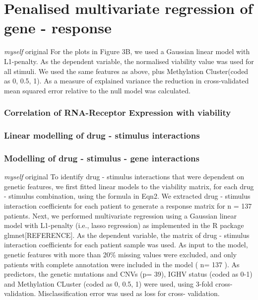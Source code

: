 \documentclass[11pt, a4paper, twosided]{book}
\begin{document}
\hypertarget{penalised-multivariate-regression-of-gene---response}{%
\chapter{Penalised multivariate regression of gene - response}\label{penalised-multivariate-regression-of-gene---response}}

\emph{myself} original
For the plots in Figure 3B, we used a Gaussian linear model with L1-penalty. As the dependent variable, the normalised viability value was used for all stimuli. We used the same features as above, plus Methylation Cluster(coded as 0, 0.5, 1). As a measure of explained variance the reduction in cross-validated mean squared error relative to the null model was calculated.

\hypertarget{correlation-of-rna-receptor-expression-with-viability}{%
\subsection{Correlation of RNA-Receptor Expression with viability}\label{correlation-of-rna-receptor-expression-with-viability}}

\hypertarget{linear-modelling-of-drug---stimulus-interactions}{%
\subsection{Linear modelling of drug - stimulus interactions}\label{linear-modelling-of-drug---stimulus-interactions}}

\hypertarget{modelling-of-drug---stimulus---gene-interactions}{%
\subsection{Modelling of drug - stimulus - gene interactions}\label{modelling-of-drug---stimulus---gene-interactions}}

\emph{myself} original
To identify drug - stimulus interactions that were dependent on genetic features, we first fitted linear models to the viability matrix, for each drug - stimulus combination, using the formula in Eqn2. We extracted drug - stimulus interaction coefficients for each patient to generate a response matrix for n = 137 patients. Next, we performed multivariate regression using a Gaussian linear model with L1-penalty (i.e., lasso regression) as implemented in the R package glmnet{[}REFERENCE{]}. As the dependent variable, the matrix of drug - stimulus interaction coefficients for each patient sample was used. As input to the model, genetic features with more than 20\% missing values were excluded, and only patients with complete annotation were included in the model ( n= 137 ). As predictors, the genetic mutations and CNVs (p= 39), IGHV status (coded as 0-1) and Methylation CLuster (coded as 0, 0.5, 1) were used, using 3-fold cross-validation. Misclassification error was used as loss for cross- validation.
\end{document}
